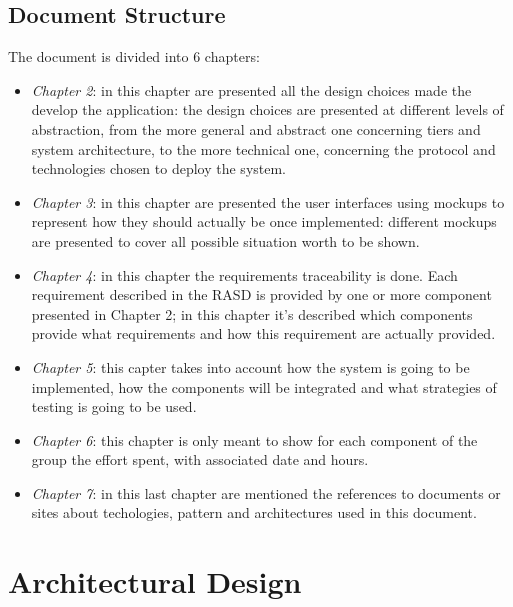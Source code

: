 \documentclass[a4paper]{report}
\begin{document}
\section{Document Structure}
The document is divided into 6 chapters:
\begin{itemize}
\item \textit{Chapter 2}: in this chapter are presented all the design choices made the develop the application: the design choices are presented at different levels of abstraction, from the more general and abstract one concerning tiers and system architecture, to the more technical one, concerning the protocol and technologies chosen to deploy the system.
\item \textit{Chapter 3}: in this chapter are presented the user interfaces using mockups to represent how they should actually be once implemented: different mockups are presented to cover all possible situation worth to be shown.
\item \textit{Chapter 4}: in this chapter the requirements traceability is done. Each requirement described in the RASD is provided by one or more component presented in Chapter 2; in this chapter it's described which components provide what requirements and how this requirement are actually provided.
\item \textit{Chapter 5}: this capter takes into account how the system is going to be implemented, how the components will be integrated and what strategies of testing is going to be used.
\item \textit{Chapter 6}: this chapter is only meant to show for each component of the group the effort spent, with associated date and hours.
\item \textit{Chapter 7}: in this last chapter are mentioned the references to documents or sites about techologies, pattern and architectures used in this document.

\end{itemize}
\chapter{Architectural Design}
\end{document}
